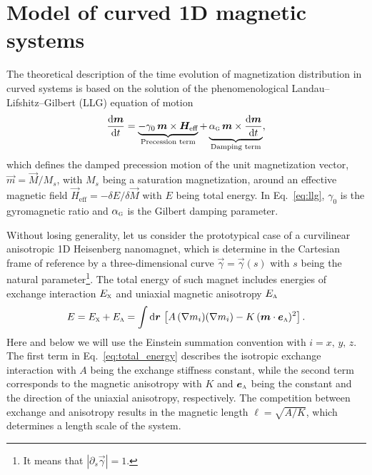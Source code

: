 \section{Model of curved 1D magnetic systems}\label{sec:theory_1D}

The theoretical description of the time evolution of magnetization distribution in curved systems is based on the solution of the phenomenological Landau--Lifshitz--Gilbert (LLG) equation of motion
\begin{equation}\label{eq:llg}
\frac{\mathrm{d}\vec{m}}{\mathrm{d}t}=\underbrace{-\gamma_0\, \vec{m}\times\vec{H}_\textrm{eff}}_{\text{Precession term}} + \underbrace{\alpha_\textsc{g}\, \vec{m}\times\frac{\mathrm{d}\vec{m}}{\mathrm{d}t}}_{\text{Damping term}},
\end{equation}
which defines the damped precession motion of the unit magnetization vector, $\vec{m}=\vec{M}/M_s$, with $M_s$ being a saturation magnetization, around an effective magnetic field $\vec{H}_\textrm{eff}=-\delta E/\delta\vec{M}$ with $E$ being total energy. In Eq.~\eqref{eq:llg}, $\gamma_0$ is the gyromagnetic ratio and $\alpha_\textsc{g}$ is the Gilbert damping parameter.

Without losing generality, let us consider the prototypical case of a curvilinear anisotropic 1D Heisenberg nanomagnet, which is determine in the Cartesian frame of reference by a three-dimensional curve $\vec{\gamma}=\vec{\gamma}(s)$ with $s$ being the natural parameter\footnote{It means that $|\partial_s\vec{\gamma}|=1$.}. The total energy of such magnet includes energies of exchange interaction $E_\textsc{x}$ and uniaxial magnetic anisotropy $E_\textsc{a}$
\begin{equation}\label{eq:total_energy}
E=E_\textsc{x} + E_\textsc{a} =\int\mathrm{d}\vec{r}\, \left[A \, (\nabla m_i)(\nabla m_i)-K \, (\vec{m}\cdot \vec{e}_\textsc{a})^2 \right].
\end{equation}
Here and below we will use the Einstein summation convention with $i = x,\,y,\,z$. The first term in Eq.~\eqref{eq:total_energy} describes the isotropic exchange interaction with $A$ being the exchange stiffness constant, while the second term corresponds to the magnetic anisotropy with $K$ and $\vec{e}_\textsc{a}$ being the constant and the direction of the uniaxial anisotropy, respectively. The competition between exchange and anisotropy results in the magnetic length $\ell=\sqrt{A/K}$, which determines a length scale of the system.

